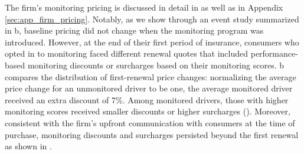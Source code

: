 The firm's monitoring pricing is discussed in detail in  as well as in Appendix \ref{sec:app_firm_pricing}. Notably, as we show through an event study summarized in b, baseline pricing did not change when the monitoring program was introduced. However, at the end of their first period of insurance, consumers who opted in to monitoring faced different renewal quotes that included performance-based monitoring discounts or surcharges based on their monitoring scores. b compares the distribution of first-renewal price changes: normalizing the average price change for an unmonitored driver to be one, the average monitored driver received an extra discount of 7\%. Among monitored drivers, those with higher monitoring scores received smaller discounts or higher surcharges (). Moreover, consistent with the firm's upfront communication with consumers at the time of purchase, monitoring discounts and surcharges persisted beyond the first renewal as shown in .
